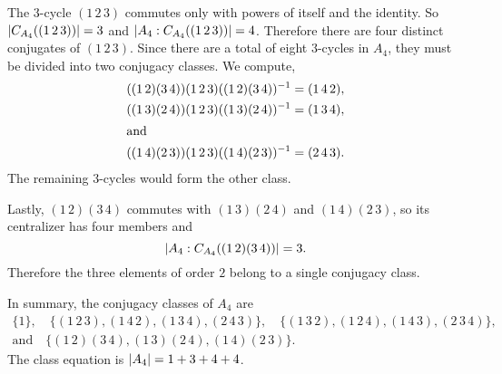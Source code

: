 \begin{enumerate}
\begin{solution}
    The $3$-cycle $(1\,2\,3)$ commutes only with powers of itself and
    the identity. So $\lvert{C_{A_4}((1\,2\,3))}\rvert = 3$ and
    $\lvert{A_4 : C_{A_4}((1\,2\,3))}\rvert = 4$. Therefore there are four
    distinct conjugates of $(1\,2\,3)$. Since there are a total of
    eight $3$-cycles in $A_4$, they must be divided into two conjugacy
    classes. We compute,
    \begin{gather*}
      ((1\,2)(3\,4))(1\,2\,3)((1\,2)(3\,4))^{-1}
      = (1\,4\,2), \\
      ((1\,3)(2\,4))(1\,2\,3)((1\,3)(2\,4))^{-1}
      = (1\,3\,4), \\ \intertext{and}
      ((1\,4)(2\,3))(1\,2\,3)((1\,4)(2\,3))^{-1}
      = (2\,4\,3).
    \end{gather*}
    The remaining $3$-cycles would form the other class.

    Lastly, $(1\,2)(3\,4)$ commutes with $(1\,3)(2\,4)$ and
    $(1\,4)(2\,3)$, so its centralizer has four members and
    \begin{equation*}
      \lvert{A_4 : C_{A_4}((1\,2)(3\,4))}\rvert = 3.
    \end{equation*}
    Therefore the three elements of order $2$ belong to a single
    conjugacy class.

    In summary, the conjugacy classes of $A_4$ are
    \begin{multline*}
      \{1\}, \quad
      \{(1\,2\,3), (1\,4\,2), (1\,3\,4), (2\,4\,3)\}, \quad
      \{(1\,3\,2), (1\,2\,4), (1\,4\,3), (2\,3\,4)\}, \\\text{and}\quad
      \{(1\,2)(3\,4), (1\,3)(2\,4), (1\,4)(2\,3)\}.
    \end{multline*}
    The class equation is $\lvert{A_4}\rvert = 1 + 3 + 4 + 4$.
  \end{solution}
\end{enumerate}
